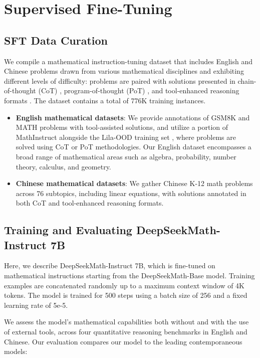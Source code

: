 \section{Supervised Fine-Tuning}

\subsection{SFT Data Curation}

We compile a mathematical instruction-tuning dataset that includes English and Chinese problems drawn from various mathematical disciplines and exhibiting different levels of difficulty: problems are paired with solutions presented in chain-of-thought (CoT) \citep{cot}, program-of-thought (PoT) \citep{pot,pal}, and tool-enhanced reasoning formats \citep{tora}. The dataset contains a total of 776K training instances.

\begin{itemize}[topsep=0pt]
    \item \textbf{English mathematical datasets}: We provide annotations of GSM8K and MATH problems with tool-assisted solutions, and utilize a portion of MathInstruct \citep{MathInstruct} alongside the Lila-OOD training set \citep{lila}, where problems are solved using CoT or PoT methodologies. Our English dataset encompasses a broad range of mathematical areas such as algebra, probability, number theory, calculus, and geometry.
    \item \textbf{Chinese mathematical datasets}: We gather Chinese K-12 math problems across 76 subtopics, including linear equations, with solutions annotated in both CoT and tool-enhanced reasoning formats.
\end{itemize}

\subsection{Training and Evaluating DeepSeekMath-Instruct 7B}

Here, we describe DeepSeekMath-Instruct 7B, which is fine-tuned on mathematical instructions starting from the DeepSeekMath-Base model. Training examples are concatenated randomly up to a maximum context window of 4K tokens. The model is trained for 500 steps using a batch size of 256 and a fixed learning rate of 5e-5.

We assess the model's mathematical capabilities both without and with the use of external tools, across four quantitative reasoning benchmarks in English and Chinese. Our evaluation compares our model to the leading contemporaneous models:

